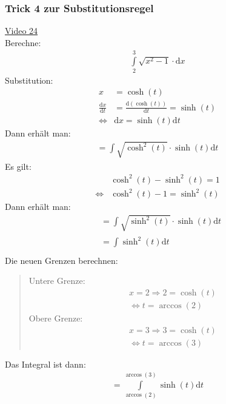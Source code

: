 \subsubsection{Trick 4 zur Substitutionsregel}
\href{https://youtu.be/xmWyiH_de9k}{Video 24}\\
Berechne:\\
\begin{align*}
\int\limits_{2}^{3}\sqrt{x^2-1}\cdot \mathrm{d}x 
\end{align*}
Substitution:\\
\begin{align*}
x&=\cosh(t)\\
\frac{\mathrm{d}x}{\mathrm{d}t}&=\frac{\mathrm{d}(\cosh(t))}{\mathrm{d}t}=\sinh(t)\\
\Leftrightarrow&\mathrm{d}x=\sinh(t)\mathrm{d}t
\end{align*}
Dann erhält man:\\
\begin{align*}
=\int\limits_{}^{} \sqrt{\cosh^2(t)}\cdot\sinh(t)\mathrm{d}t
\end{align*}
Es gilt:\\
\begin{align*}
&\cosh^2(t)-\sinh^2(t)=1\\
\Leftrightarrow & \cosh^2(t)-1=\sinh^2(t)
\end{align*}
Dann erhält man:\\
\begin{align*}
&=\int\limits_{}^{} \sqrt{\sinh^2(t)}\cdot \sinh(t)\mathrm{d}t\\
&=\int\limits_{}^{} \sinh^2(t)\mathrm{d}t
\end{align*}
Die neuen Grenzen berechnen:\\
\begin{quote}
	Untere Grenze:\\
	\begin{align*}
	&x=2\Rightarrow 2=\cosh(t)\\
	&\Leftrightarrow t=\arccos(2)
	\end{align*}
	Obere Grenze:\\
	\begin{align*}
	&x=3\Rightarrow 3=\cosh(t)\\
	&\Leftrightarrow t=\arccos(3)
	\end{align*}
\end{quote}
Das Integral ist dann:\\
\begin{align*}
=\int\limits_{\arccos(2)}^{\arccos(3)}\sinh(t) \mathrm{d}t
\end{align*}
